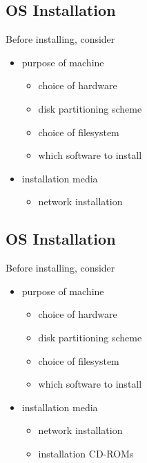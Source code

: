 \documentclass[xga]{xdvislides}
\begin{document}
\subsection{OS Installation}
Before installing, consider
\begin{itemize}
	\item purpose of machine
		\begin{itemize}
			\item choice of hardware
			\item disk partitioning scheme
			\item choice of filesystem
			\item which software to install
		\end{itemize}
	\item installation media
		\begin{itemize}
			\item network installation
		\end{itemize}
\end{itemize}

\subsection{OS Installation}
Before installing, consider
\begin{itemize}
	\item purpose of machine
		\begin{itemize}
			\item choice of hardware
			\item disk partitioning scheme
			\item choice of filesystem
			\item which software to install
		\end{itemize}
	\item installation media
		\begin{itemize}
			\item network installation
			\item installation CD-ROMs
		\end{itemize}
\end{itemize}
\end{document}
